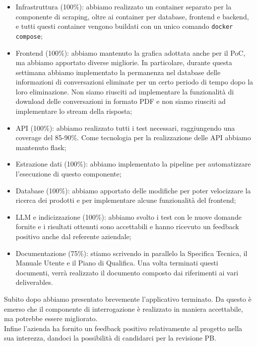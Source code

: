 \begin{itemize}
    \item Infrastruttura (100\%): abbiamo realizzato un container separato per la componente di scraping, oltre ai container per database, frontend e backend, e tutti questi container vengono buildati con un unico comando \texttt{docker compose};
    \item Frontend (100\%): abbiamo mantenuto la grafica adottata anche per il PoC, ma abbiamo apportato diverse migliorie. In particolare, durante questa settimana abbiamo implementato la permanenza nel database delle informazioni di conversazioni eliminate per un certo periodo di tempo dopo la loro eliminazione. Non siamo riusciti ad implementare la funzionalità di download delle conversazioni in formato PDF e non siamo riusciti ad implementare lo stream della risposta;
    \item API (100\%): abbiamo realizzato tutti i test necessari, raggiungendo una coverage del 85-90\%. Come tecnologia per la realizzazione delle API abbiamo mantenuto flask;
    \item Estrazione dati (100\%): abbiamo implementato la pipeline per automatizzare l'esecuzione di questo componente;
    \item Database (100\%): abbiamo apportato delle modifiche per poter velocizzare la ricerca dei prodotti e per implementare alcune funzionalità del frontend;
    \item LLM e indicizzazione (100\%): abbiamo svolto i test con le nuove domande fornite e i risultati ottenuti sono accettabili e hanno ricevuto un feedback positivo anche dal referente aziendale;
    \item Documentazione (75\%): stiamo scrivendo in parallelo la Specifica Tecnica, il Manuale Utente e il Piano di Qualifica. Una volta terminati questi documenti, verrà realizzato il documento composto dai riferimenti ai vari deliverables.
\end{itemize}
Subito dopo abbiamo presentato brevemente l'applicativo terminato. Da questo è emerso che il componente di interrogazione è realizzato in maniera accettabile, ma potrebbe essere migliorato. \\
Infine l'azienda ha fornito un feedback positivo relativamente al progetto nella sua interezza, dandoci la possibilità di candidarci per la revisione PB.
